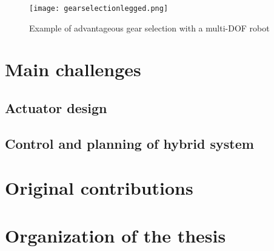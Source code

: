 \begin{figure}[H]
	\centering
		\texttt{[image: gearselectionlegged.png]}
	\caption{Example of advantageous gear selection with a multi-DOF robot}
	\label{fig:gearselectionlegged}
\end{figure}


\section{Main challenges}
\label{sec:MainChallenges}

\subsection{Actuator design}
\label{sec:ActuatorDesign}

\subsection{Control and planning of hybrid system}
\label{sec:ControlAndPlanningOfHybridSystem}



\section{Original contributions}
\label{sec:contribution}


\section{Organization of the thesis}
\label{sec:OrganisationOfTheThesis}




